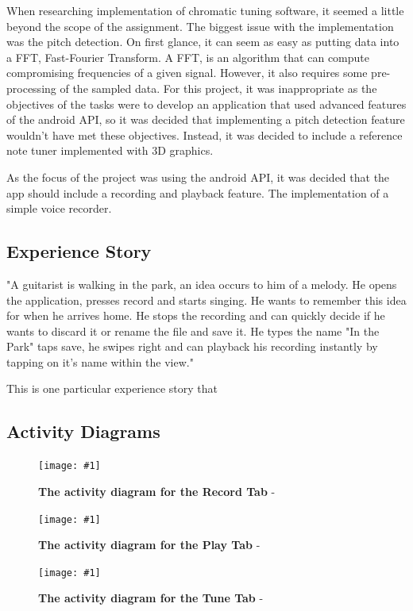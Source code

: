 \documentclass[conference]{acmsiggraph}
\newcommand{\figuremacroW}[4]{
	\begin{figure}[!ht] %
		\centering
		\texttt{[image: \#1]}
		\caption[#2]{\textbf{#2} - #3}
		\label{fig:#1}
	\end{figure}
}
\begin{document}
When researching implementation of chromatic tuning software, it seemed a little beyond the scope of the assignment. The biggest issue with the implementation was the pitch detection. On first glance, it can seem as easy as putting data into a FFT, Fast-Fourier Transform. A FFT, is an algorithm that can compute compromising frequencies of a given signal. \cite{FFT} However, it also requires some pre-processing of the sampled data. For this project, it was inappropriate as the objectives of the tasks were to develop an application that used advanced features of the android API, so it was decided that implementing a pitch detection feature wouldn't have met these objectives. Instead, it was decided to include a reference note tuner implemented with 3D graphics.


As the focus of the project was using the android API, it was decided that the app should include a recording and playback feature. The implementation of a simple voice recorder. %


\subsection{Experience Story}

"A guitarist is walking in the park, an idea occurs to him of a melody. He opens the application, presses record and starts singing. He wants to remember this idea for when he arrives home. He stops the recording and can quickly decide if he wants to discard it or rename the file and save it. He types the name "In the Park" taps save, he swipes right and can playback his recording instantly by tapping on it's name within the view." 

This is one particular experience story that 

\subsection{Activity Diagrams}
\figuremacroW
{RecordTab}
{The activity diagram for the Record Tab}
{}
{1.0}

\figuremacroW
{PlayTab}
{The activity diagram for the Play Tab}
{}
{1.0}

\figuremacroW
{TuneTab}
{The activity diagram for the Tune Tab}
{}
{1.0}


\end{document}
